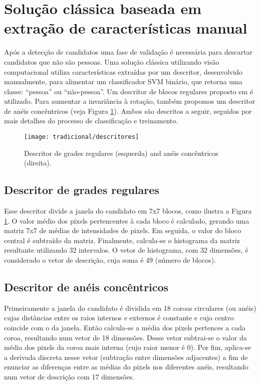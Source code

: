\section{Solução clássica baseada em extração de características manual}
\label{sec:classical}

    Após a detecção de candidatos uma fase de validação é necessária para descartar candidatos que não são pessoas. Uma solução clássica utilizando visão computacional \cite{rauter} utiliza características extraídas por um descritor, desenvolvido manualmente, para alimentar um classificador SVM binário, que retorna uma classe: ``pessoa'' ou ``não-pessoa''. Um descritor de blocos regulares proposto em \cite{rauter} é utilizado. Para aumentar a invariância à rotação, também propomos um descritor de anéis concêntricos (veja Figura \ref{fig:descriptors}). Ambos são descritos a seguir, seguidos por mais detalhes do processo de classificação e treinamento.

    \begin{figure}
    \centering
    \texttt{[image: tradicional/descritores]}
    \caption{Descritor de grades regulares (esquerda) and anéis concêntricos (direita).}
    \label{fig:descriptors}
    \end{figure}

    \subsection{Descritor de grades regulares}
      Esse descritor divide a janela do candidato em 7x7 blocos, como ilustra a Figura \ref{fig:descriptors}. O valor médio dos pixels pertencentes à cada bloco é calculado, gerando uma matriz 7x7 de médias de intensidades de pixels. Em seguida, o valor do bloco central é subtraído da matriz. Finalmente, calcula-se o histograma da matriz resultante utilizando 32 intervalos. O vetor de histograma, com 32 dimensões, é considerado o vetor de descrição, cuja soma é 49 (número de blocos).

    \subsection{Descritor de anéis concêntricos}
       Primeiramente a janela do candidato é dividida em 18 coroas circulares (ou anéis) cujas distâncias entre os raios internos e externos é constante e cujo centro coincide com o da janela. Então calcula-se a média dos pixels pertences a cada coroa, resultando num vetor de 18 dimensões. Desse vetor subtrai-se o valor da média dos pixels da coroa mais interna (cujo raior menor é 0). Por fim, aplica-se a derivada discreta nesse vetor (subtração entre dimensões adjacentes) a fim de enunciar as diferenças entre as médias do pixels nos diferentes anéis, resultando num vetor de descrição com 17 dimensões.

